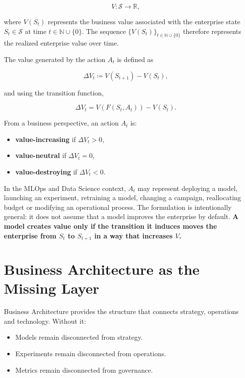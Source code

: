\documentclass[
  a4paper,
  DIV=11,
  numbers=noendperiod]{scrartcl}
\providecommand{\tightlist}{%
  \setlength{\itemsep}{0pt}\setlength{\parskip}{0pt}}
\begin{document}
\[
V \colon \mathcal{S} \rightarrow \mathbb{R},
\]

where \(V(S_t)\) represents the business value associated with the
enterprise state \(S_t \in \mathcal{S}\) at time
\(t \in \mathbb{N} \cup \{0\}\). The sequence
\(\{V(S_t)\}_{t \in \mathbb{N} \cup \{0\}}\) therefore represents the
realized enterprise value over time.

The value generated by the action \(A_t\) is defined as

\[
\Delta V_t \coloneqq V(S_{t+1}) - V(S_t),
\]

and using the transition function,

\[
\Delta V_t = V(F(S_t, A_t)) - V(S_t).
\]

From a business perspective, an action \(A_t\) is:

\begin{itemize}
\tightlist
\item
  \textbf{value-increasing} if \(\Delta V_t > 0\),
\item
  \textbf{value-neutral} if \(\Delta V_t = 0\),
\item
  \textbf{value-destroying} if \(\Delta V_t < 0\).
\end{itemize}

In the MLOps and Data Science context, \(A_t\) may represent deploying a
model, launching an experiment, retraining a model, changing a campaign,
reallocating budget or modifying an operational process. The formulation
is intentionally general: it does not assume that a model improves the
enterprise by default. \textbf{A model creates value only if the
transition it induces moves the enterprise from \(S_t\) to \(S_{t+1}\)
in a way that increases \(V\).}

\section{Business Architecture as the Missing
Layer}\label{business-architecture-as-the-missing-layer}

Business Architecture provides the structure that connects strategy,
operations and technology. Without it:

\begin{itemize}
\tightlist
\item
  Models remain disconnected from strategy.
\item
  Experiments remain disconnected from operations.
\item
  Metrics remain disconnected from governance.
\end{itemize}
\end{document}
